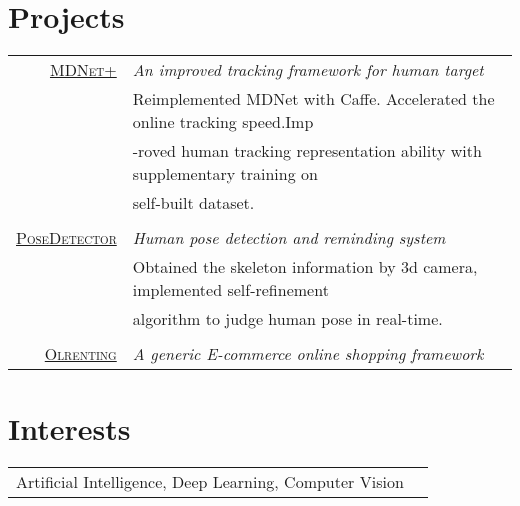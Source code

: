 \documentclass[a4paper,10pt]{article}
\begin{document}
\section{Projects}
\begin{tabular}{rl}	
 \textsc{\href{https://github.com/rao1219/MDNet}{MDNet+}} & \emph{An improved tracking framework for human target}\\
& Reimplemented MDNet with Caffe. Accelerated the online tracking speed.Imp\\
& -roved human tracking representation ability with supplementary training on\\
& self-built dataset.\\
\\

 \textsc{\href{https://github.com/rao1219/intel_cup-3Dcamera}{PoseDetector}} & \emph{Human pose detection and reminding system}\\
& Obtained the skeleton information by 3d camera, implemented self-refinement \\
& algorithm to judge human pose in real-time.\\ 
\\
 \textsc{\href{https://github.com/rao1219/olhandicrafts}{Olrenting}} & \emph{A generic E-commerce online shopping framework}\\
\end{tabular}

\section{Interests}
\begin{tabular}{rl}
Artificial Intelligence, Deep Learning, Computer Vision
\end{tabular}




\end{document}
